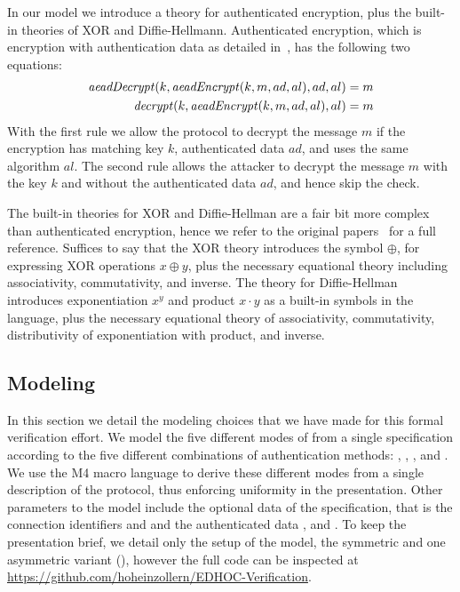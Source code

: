 In our model we introduce a theory for authenticated encryption, plus the
built-in theories of XOR and Diffie-Hellmann.
%
Authenticated encryption, which is encryption with authentication data as
detailed in~\cite{aead}, has the following two equations:
\begin{align*}
  \mathit{aeadDecrypt}(k, \mathit{aeadEncrypt}(k, m, ad, al), ad, al) = m\\
  \mathit{decrypt}(k, \mathit{aeadEncrypt}(k, m, ad, al), al) = m
\end{align*}
With the first rule we allow the protocol to decrypt the message $m$ if the
encryption has matching key $k$, authenticated data $ad$, and uses the same
algorithm $al$.
%
The second rule allows the attacker to decrypt the message $m$ with the key $k$
and without the authenticated data $ad$, and hence skip the check.

The built-in theories for XOR and Diffie-Hellman are a fair bit more complex
than authenticated encryption, hence we refer to the original
papers~\cite{xorTamarin,dhTamarin} for a full reference.
%
Suffices to say that the XOR theory introduces the symbol $\oplus$, for
expressing XOR operations $x \oplus y$, plus the necessary equational theory
including associativity, commutativity, and inverse.
%
The theory for Diffie-Hellman introduces exponentiation $x^y$ and product
$x \cdot y$ as a built-in symbols in the language, plus the necessary equational
theory of associativity, commutativity, distributivity of exponentiation with
product, and inverse.

\subsection{Modeling \mEdhoc}
In this section we detail the modeling choices that we have made for this formal
verification effort.
%
We model the five different modes of \mEdhoc{} from a single specification
according to the five different combinations of authentication methods:
\mPskPsk, \mSigSig, \mSigStat, \mStatSig and \mStatStat.
%
We use the M4 macro language to derive these different modes from a single
description of the protocol, thus enforcing uniformity in the presentation.
%
Other parameters to the model include the optional data of the \mEdhoc{}
specification, that is the connection identifiers \mCi and \mCr and
the authenticated data \mADone, \mADtwo and \mADthree.
%
To keep the presentation brief, we detail only the setup of the model,
the symmetric and one asymmetric variant (\mSigStat), however the full
code can be inspected at
\url{https://github.com/hoheinzollern/EDHOC-Verification}.

